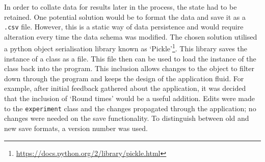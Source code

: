 In order to collate data for results later in the process, the state had to be retained. One potential solution would be to format the data and save it as a \verb|.csv| file. However, this is a static way of data persistence and would require alteration every time the data schema was modified. The chosen solution utilised a python object serialisation library known as `Pickle'\footnote{\url{https://docs.python.org/2/library/pickle.html}}. This library saves the instance of a class as a file. This file then can be used to load the instance of the class back into the program. This inclusion allows changes to the object to filter down through the program and keeps the design of the application fluid. For example, after initial feedback gathered about the application, it was decided that the inclusion of `Round times' would be a useful addition. Edits were made to the \verb|experiment| class and the changes propagated through the application; no changes were needed on the save functionality. To distinguish between old and new save formats, a version number was used.